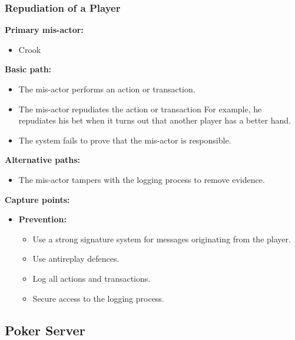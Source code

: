 \documentclass[a4paper,11pt]{report}
\begin{document}
\subsubsection{Repudiation of a Player}
\label{Repudiation of a Player}
\textbf{Primary mis-actor:}
\begin{itemize}
\item Crook
\end{itemize}
\textbf{Basic path:}
\begin{itemize}
\item The mis-actor performs an action or transaction.
\item The mis-actor repudiates the action or transaction For example, he repudiates his bet when it turns out that another player has a better hand.
\item The system fails to prove that the mis-actor is responsible.
\end{itemize}
\textbf{Alternative paths:}
\begin{itemize}
\item The mis-actor tampers with the logging process to remove evidence.
\end{itemize}
\textbf{Capture points:}
\begin{itemize}
\item \textbf{Prevention:}
\begin{itemize}
\item Use a strong signature system for messages originating from the player.
\item Use antireplay defences.
\item Log all actions and transactions.
\item Secure access to the logging process.
\end{itemize}
\end{itemize}

\subsection{Poker Server}
\end{document}
